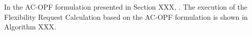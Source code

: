 In the AC-OPF formulation presented in Section XXX, . The execution of the Flexibility Request Calculation based on the AC-OPF formulation is shown in Algorithm XXX. 





